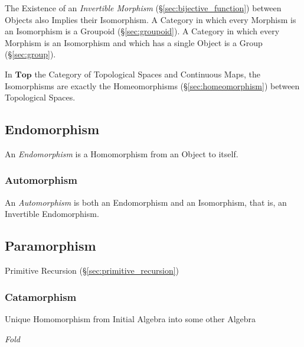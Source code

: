 The Existence of an \emph{Invertible Morphism}
(\S\ref{sec:bijective_function}) between Objects also Implies their
Isomorphism. A Category in which every Morphism is an Isomorphism is a
Groupoid (\S\ref{sec:groupoid}). A Category in which every Morphism is
an Isomorphism and which has a single Object is a Group
(\S\ref{sec:group}).

In $\mathbf{Top}$ the Category of Topological Spaces and Continuous
Maps, the Isomorphisms are exactly the Homeomorphisms
(\S\ref{sec:homeomorphism}) between Topological Spaces.



\subsection{Endomorphism}

An \emph{Endomorphism} is a Homomorphism from an Object to itself.



\subsubsection{Automorphism}\label{sec:automorphism}

An \emph{Automorphism} is both an Endomorphism and an Isomorphism,
that is, an Invertible Endomorphism.



\subsection{Paramorphism}\label{sec:paramorphism}

Primitive Recursion (\S\ref{sec:primitive_recursion})



\subsubsection{Catamorphism}\label{sec:catamorphism}

Unique Homomorphism from Initial Algebra into some other Algebra

\emph{Fold}




